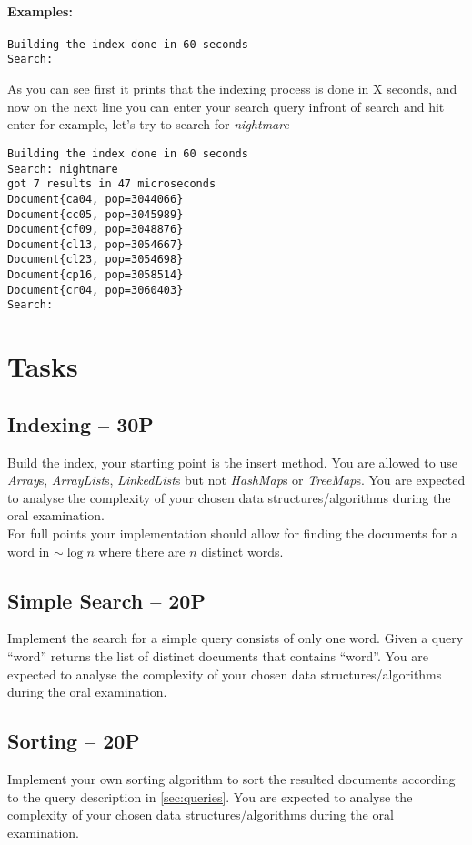 \documentclass[11pt]{article}
\begin{document}
\paragraph{\textbf{Examples:}}
\begin{verbatim}
Building the index done in 60 seconds
Search: 
\end{verbatim}

As you can see first it prints that the indexing process is done in X seconds, and now on the next line you can enter your search query infront of search and hit enter for example, let's try to search for \textit{nightmare}

\begin{verbatim}
Building the index done in 60 seconds
Search: nightmare
got 7 results in 47 microseconds
Document{ca04, pop=3044066}
Document{cc05, pop=3045989}
Document{cf09, pop=3048876}
Document{cl13, pop=3054667}
Document{cl23, pop=3054698}
Document{cp16, pop=3058514}
Document{cr04, pop=3060403}
Search: 
\end{verbatim}
 
 
\section{Tasks}

\subsection{Indexing -- 30P} 
\label{ssec:indexing}
Build the index, your starting point is the insert method. You are allowed to use \emph{Array}s, \emph{ArrayList}s, \emph{LinkedList}s but not \emph{HashMap}s or \emph{TreeMap}s. You are expected to analyse the complexity of your chosen data structures/algorithms during the oral examination.\\

For full points your implementation should allow for finding the documents for a word in $\sim \log n$ where there are $n$ distinct words.

\subsection{Simple Search -- 20P} 
Implement the search for a simple query consists of only one word. Given a query ``word'' returns the list of distinct documents that contains ``word''. You are expected to analyse the complexity of your chosen data structures/algorithms during the oral examination.

\subsection{Sorting -- 20P} 
Implement your own sorting algorithm to sort the resulted documents according to the query description in \ref{sec:queries}. You are expected to analyse the complexity of your chosen data structures/algorithms during the oral examination.
\end{document}
